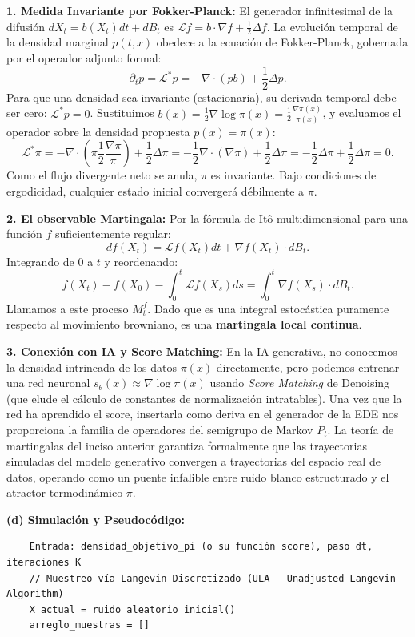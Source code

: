 \documentclass[11pt, letterpaper]{article}
\begin{document}
\begin{solucion}
    \textbf{1. Medida Invariante por Fokker-Planck:}
    El generador infinitesimal de la difusión $dX_t = b(X_t) dt + dB_t$ es $\mathcal{L}f = b \cdot \nabla f + \frac{1}{2}\Delta f$.
    La evolución temporal de la densidad marginal $p(t,x)$ obedece a la ecuación de Fokker-Planck, gobernada por el operador adjunto formal:
    \[ \partial_t p = \mathcal{L}^* p = -\nabla \cdot (p b) + \frac{1}{2}\Delta p. \]
    Para que una densidad sea invariante (estacionaria), su derivada temporal debe ser cero: $\mathcal{L}^* p = 0$.
    Sustituimos $b(x) = \frac{1}{2}\nabla \log \pi(x) = \frac{1}{2} \frac{\nabla \pi(x)}{\pi(x)}$, y evaluamos el operador sobre la densidad propuesta $p(x) = \pi(x)$:
    \[ \mathcal{L}^* \pi = -\nabla \cdot \left( \pi \frac{1}{2} \frac{\nabla \pi}{\pi} \right) + \frac{1}{2}\Delta \pi = -\frac{1}{2} \nabla \cdot (\nabla \pi) + \frac{1}{2}\Delta \pi = -\frac{1}{2}\Delta \pi + \frac{1}{2}\Delta \pi = 0. \]
    Como el flujo divergente neto se anula, $\pi$ es invariante. Bajo condiciones de ergodicidad, cualquier estado inicial convergerá débilmente a $\pi$.

    \textbf{2. El observable Martingala:}
    Por la fórmula de Itô multidimensional para una función $f$ suficientemente regular:
    \[ df(X_t) = \mathcal{L}f(X_t) dt + \nabla f(X_t) \cdot dB_t. \]
    Integrando de $0$ a $t$ y reordenando:
    \[ f(X_t) - f(X_0) - \int_0^t \mathcal{L}f(X_s) ds = \int_0^t \nabla f(X_s) \cdot dB_t. \]
    Llamamos a este proceso $M_t^f$. Dado que es una integral estocástica puramente respecto al movimiento browniano, es una \textbf{martingala local continua}.

    \textbf{3. Conexión con IA y Score Matching:}
    En la IA generativa, no conocemos la densidad intrincada de los datos $\pi(x)$ directamente, pero podemos entrenar una red neuronal $s_\theta(x) \approx \nabla \log \pi(x)$ usando \textit{Score Matching} de Denoising (que elude el cálculo de constantes de normalización intratables).
    Una vez que la red ha aprendido el score, insertarla como deriva en el generador de la EDE nos proporciona la familia de operadores del semigrupo de Markov $P_t$. La teoría de martingalas del inciso anterior garantiza formalmente que las trayectorias simuladas del modelo generativo convergen a trayectorias del espacio real de datos, operando como un puente infalible entre ruido blanco estructurado y el atractor termodinámico $\pi$.

    \textbf{(d) Simulación y Pseudocódigo:}
    \begin{verbatim}
    Entrada: densidad_objetivo_pi (o su función score), paso dt, iteraciones K
    // Muestreo vía Langevin Discretizado (ULA - Unadjusted Langevin Algorithm)
    X_actual = ruido_aleatorio_inicial()
    arreglo_muestras = []
    

\end{verbatim}
\end{solucion}
\end{document}
